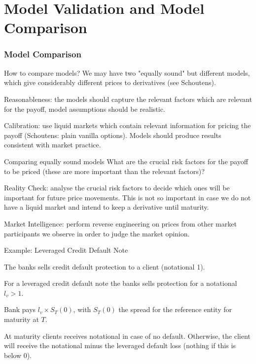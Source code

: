 
\part{Model Validation and Model Comparison}                          %


\section{Model Comparison}

{How to compare models?}
We may have two "equally sound" but different models, which give considerably different prices to derivatives (see Schoutens).

\item<1-> Reasonableness: the models should capture the relevant factors which are relevant for the payoff, model assumptions should be realistic.
\item<2-> Calibration: use liquid markets which contain relevant information for pricing the payoff (Schoutens: plain vanilla options). Models should produce results consistent with market practice.

{Comparing equally sound models}
What are the crucial risk factors for the payoff to be priced (these are more important than the relevant factors)?
\item<1-> Reality Check: analyse the crucial risk factors to decide which ones will be important for future price movements. This is not so important in case we do not have a liquid market and intend to keep a derivative until maturity.
\item<2-> Market Intelligence: perform reverse engineering on prices from other market participants we observe in order to judge the market opinion.

{Example: Leveraged Credit Default Note}
\item<1-> The banks sells credit default protection to a client (notational 1).
\item<2-> For a leveraged credit default note the banks sells protection for a notational $l_v>1$.
\item<3-> Bank pays $l_v \times S_T(0)$, with $S_T(0)$ the spread for the reference entity for maturity at $T$.
\item<4-> At maturity clients receives notational in case of no default. Otherwise, the client will receive the notational minus the leveraged default loss (nothing if this is below 0).

